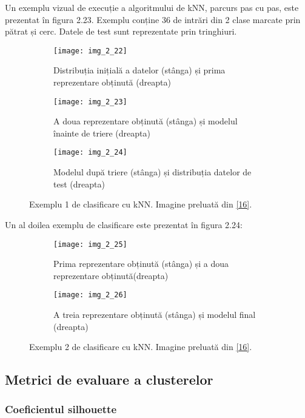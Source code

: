 Un exemplu vizual de execuție a algoritmului de kNN, parcurs pas cu pas, este prezentat în figura 2.23. Exemplu conține 36 de intrări din 2 clase marcate prin pătrat și cerc. Datele de test sunt reprezentate prin tringhiuri.
\begin{figure}[!h]
  \begin{subfigure}[b]{0.4\textwidth}
    \texttt{[image: img\_2\_22]}
    \caption{Distribuția inițială a datelor (stânga) și prima reprezentare obținută (dreapta)}
    \label{fig:f1}
  \end{subfigure}
  \hfill
  \begin{subfigure}[b]{0.4\textwidth}
    \texttt{[image: img\_2\_23]}
    \caption{A doua reprezentare obținută (stânga) și modelul înainte de triere (dreapta)}
    \label{fig:f2}
  \end{subfigure}
  \hfill
  \begin{subfigure}[b]{0.4\textwidth}
    \texttt{[image: img\_2\_24]}
    \caption{Modelul după triere (stânga) și distribuția datelor de test (dreapta)}
    \label{fig:f3}
  \end{subfigure}
  \caption[Exemplu 1 de clasificare cu kNN]{Exemplu 1 de clasificare cu kNN. Imagine preluată din \hyperlink{gongdeguo}{[16]}.}
\end{figure}  

Un al doilea exemplu de clasificare este prezentat în figura 2.24:
\begin{figure}[!h]
  \begin{subfigure}[b]{0.4\textwidth}
    \texttt{[image: img\_2\_25]}
    \caption{Prima reprezentare obținută (stânga) și a doua reprezentare obținută(dreapta)}
    \label{fig:f1}
  \end{subfigure}
  \hfill
  \begin{subfigure}[b]{0.4\textwidth}
    \texttt{[image: img\_2\_26]}
    \caption{A treia reprezentare obținută (stânga) și modelul final (dreapta)}
    \label{fig:f2}
  \end{subfigure}
  \caption[Exemplu 2 de clasificare cu kNN]{Exemplu 2 de clasificare cu kNN. Imagine preluată din \hyperlink{gongdeguo}{[16]}.}
\end{figure}

\subsection{Metrici de evaluare a clusterelor}

\subsubsection{Coeficientul silhouette}


